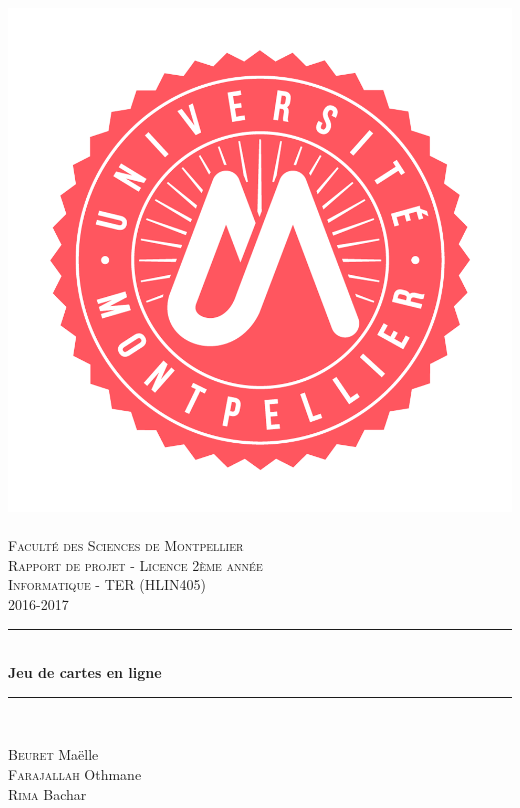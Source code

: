\documentclass[12pt]{report}
\date{April 2017}
\newcommand{\HRule}{\rule{\linewidth}{0.5mm}}
\begin{document}
	\begin{titlepage}

		\begin{center}

			\includegraphics[scale=0.11]{images/logo-um.png}~\\[1.5cm]
			\textsc{\Large Faculté des Sciences de Montpellier}\\[2cm]
			\textsc{\Large Rapport de projet - Licence 2ème année}\\[0.5cm]
			\textsc{\Large Informatique - TER (HLIN405)}\\[0.5cm]
			\textsc{\Large 2016-2017}\\[1.5cm]

			\HRule \\[0.4cm]
			{ \huge \bfseries Jeu de cartes en ligne\\[0.4cm] }

			\HRule \\[2cm]
			
			\begin{flushleft}
				\begin{minipage}[b]{6cm}
					\large	\textsc{Beuret} Maëlle\\[0.5cm]
					\large	\textsc{Farajallah} Othmane\\[0.5cm]
					\large	\textsc{Rima} Bachar\\[0.5cm]
				\end{minipage}
			\end{flushleft}
			

\end{center}
\end{titlepage}
\end{document}
